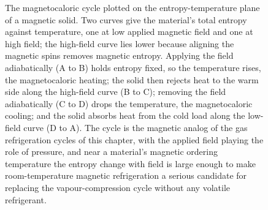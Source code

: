\begin{figure}[htbp]
\caption[Magnetocaloric refrigeration cycle on the entropy-temperature plane]{The
magnetocaloric cycle plotted on the entropy-temperature plane of a magnetic
solid. Two curves give the material's total entropy against temperature, one at
low applied magnetic field and one at high field; the high-field curve lies lower
because aligning the magnetic spins removes magnetic entropy. Applying the field
adiabatically (A to B) holds entropy fixed, so the temperature rises, the
magnetocaloric heating; the solid then rejects heat to the warm side along the
high-field curve (B to C); removing the field adiabatically (C to D) drops the
temperature, the magnetocaloric cooling; and the solid absorbs heat from the cold
load along the low-field curve (D to A). The cycle is the magnetic analog of the
gas refrigeration cycles of this chapter, with the applied field playing the role
of pressure, and near a material's magnetic ordering temperature the entropy
change with field is large enough to make room-temperature magnetic refrigeration
a serious candidate for replacing the vapour-compression cycle without any
volatile refrigerant.}
\label{fig:vol04ch03:magnetocaloric-st}
\end{figure}
